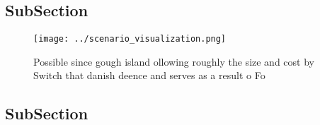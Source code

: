 \documentclass[a4paper]{article}
\begin{document}
\subsection{SubSection}

\begin{figure}
\centering
\texttt{[image: ../scenario\_visualization.png]}
\caption{Possible since gough island ollowing roughly the size and cost by Switch that danish deence and serves as a result o Fo
}
\end{figure}
 
\subsection{SubSection}
\end{document}
